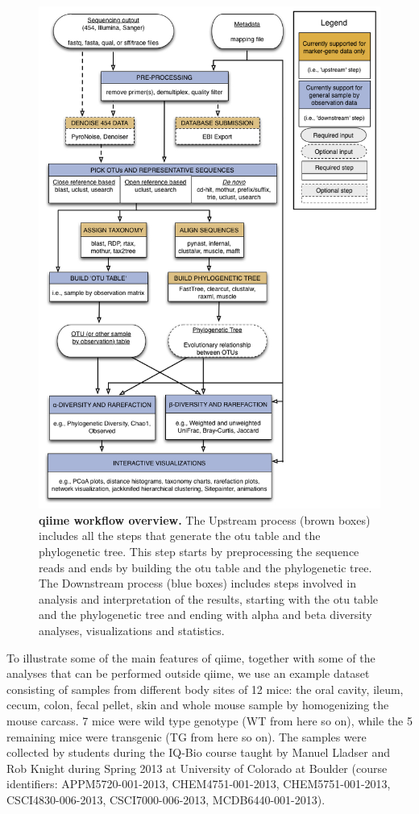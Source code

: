 \begin{figure}[htbp]
\includegraphics[width=0.75\columnwidth]{chapter_book_figures/Figure_1.jpg}
\caption[\gls{qiime} workflow overview]{\textbf{\gls{qiime} workflow overview.} The Upstream process (brown boxes)
includes all the steps that generate the \gls{otu} table and the phylogenetic tree. This step starts by
preprocessing the sequence reads and ends by building the \gls{otu} table and the phylogenetic tree.
The Downstream process (blue boxes) includes steps involved in analysis and interpretation of the results,
starting with the \gls{otu} table and the phylogenetic tree and ending with alpha and beta diversity analyses,
visualizations and statistics.}
\label{BFigure1}
\end{figure}

To illustrate some of the main features of \gls{qiime}, together with some of the analyses that can be
performed outside \gls{qiime}, we use an example dataset consisting of samples from different body sites
of 12 mice: the oral cavity, ileum, cecum, colon, fecal pellet, skin and whole mouse sample by homogenizing
the mouse carcass. 7 mice were wild type genotype (WT from here so on), while the 5 remaining mice were
transgenic (TG from here so on). The samples were collected by students during the IQ-Bio course taught by
Manuel Lladser and Rob Knight during Spring 2013 at University of Colorado at Boulder (course identifiers:
APPM5720-001-2013, CHEM4751-001-2013, CHEM5751-001-2013, CSCI4830-006-2013, CSCI7000-006-2013, MCDB6440-001-2013).

